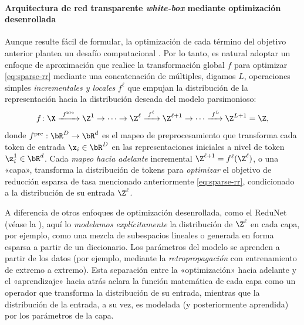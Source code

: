 \documentclass[../../book-main.tex]{subfiles}
\begin{document}
\paragraph{Arquitectura de red transparente \textit{white-box} mediante optimización desenrollada}

Aunque resulte fácil de formular, la optimización de cada término del objetivo anterior
plantea un desafío computacional \cite{Wright-Ma-2022}. Por lo tanto,
es natural adoptar un enfoque de aproximación que realice la
transformación global $f$ para optimizar 
\eqref{eq:sparse-rr} mediante una concatenación de múltiples, digamos $L$,
operaciones simples \textit{incrementales y locales} $f^\ell$ que empujan
la distribución de la representación hacia la distribución deseada del modelo parsimonioso:
\begin{equation}
    f\colon \X \xrightarrow{\hspace{1mm} f^{\mathrm{pre}} \hspace{1mm}}
    \Z^1 \rightarrow \cdots \rightarrow \Z^\ell
    \xrightarrow{\hspace{1mm} f^{\ell} \hspace{1mm}} \Z^{\ell+1}
    \rightarrow  \cdots \xrightarrow{\hspace{1mm} f^{L}} \Z^{L+1} = \Z,
    \label{eq:incremental}
\end{equation}
donde $f^{\mathrm{pre}}: \bR^{D} \rightarrow \bR^{d}$ es el mapeo de preprocesamiento
que transforma cada token de entrada $\x_{i} \in \bR^{D}$ en las
representaciones iniciales a nivel de token $\z_{i}^{1} \in \bR^{d}$.
Cada \textit{mapeo hacia adelante} incremental $\Z^{\ell + 1} =
f^\ell(\Z^\ell)$, o una «capa», transforma la distribución de tokens
para \textit{optimizar} el objetivo de reducción esparsa de tasa mencionado anteriormente
\eqref{eq:sparse-rr}, condicionado a la distribución de su entrada $\Z^\ell$.

\begin{remark}
    A diferencia de otros enfoques de optimización desenrollada, como el
    ReduNet (véase la ), aquí
    lo \textit{modelamos explícitamente} la distribución de $\Z^\ell$ en cada
    capa, por ejemplo, como una mezcla de subespacios lineales o generada en forma esparsa
    a partir de un diccionario. Los parámetros del modelo se aprenden a partir de los datos
    (por ejemplo, mediante la \textit{retropropagación} con entrenamiento de extremo a extremo).
    Esta separación entre la «optimización» hacia adelante y el
    «aprendizaje» hacia atrás aclara la función matemática de cada capa como un operador
    que transforma la distribución de su entrada, mientras que la distribución
    de la entrada, a su vez, es modelada (y posteriormente aprendida) por los
    parámetros de la capa.
\end{remark}
\end{document}
